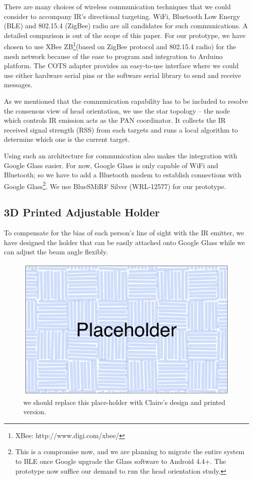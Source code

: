 There are many choices of wireless communication techniques that we could consider to accompany IR's directional targeting. WiFi, Bluetooth Low Energy (BLE) and 802.15.4 (ZigBee) radio are all candidates for such communications. A detailed comparison is out of the scope of this paper. For our prototype, we have chosen to use XBee ZB\footnote{XBee: http://www.digi.com/xbee/}(based on ZigBee protocol and 802.15.4 radio) for the mesh network because of the ease to program and integration to Arduino platform. The COTS adapter provides an easy-to-use interface where we could use either hardware serial pins or the software serial library to send and receive messages. 

As we mentioned that the communication capability has to be included to resolve the consensus view of head orientation, we use the star topology -- the node which controls IR emission acts as the PAN coordinator. It collects the IR received signal strength (RSS) from each targets and runs a local algorithm to determine which one is the current target. 

Using such an architecture for communication also makes the integration with Google Glass easier. For now, Google Glass is only capable of WiFi and Bluetooth; so we have to add a Bluetooth modem to establish connections with Google Glass\footnote{This is a compromise now, and we are planning to migrate the entire system to BLE once Google upgrade the Glass software to Android 4.4+. The prototype now suffice our demand to run the head orientation study.}. We use BlueSMiRF Silver (WRL-12577) for our prototype. 

\subsection{3D Printed Adjustable Holder}
\label{sec:3d-print-adjust}
To compensate for the bias of each person's line of sight with the IR emitter, we have designed the holder that can be easily attached onto Google Glass while we can adjust the beam angle flexibly.

\begin{figure}[t]
\centering
\includegraphics[width=0.9\columnwidth]{figures/placeholder.pdf}
\caption{we should replace this place-holder with Claire's design and printed version.}
\label{fig:3d-holder}
\end{figure}


